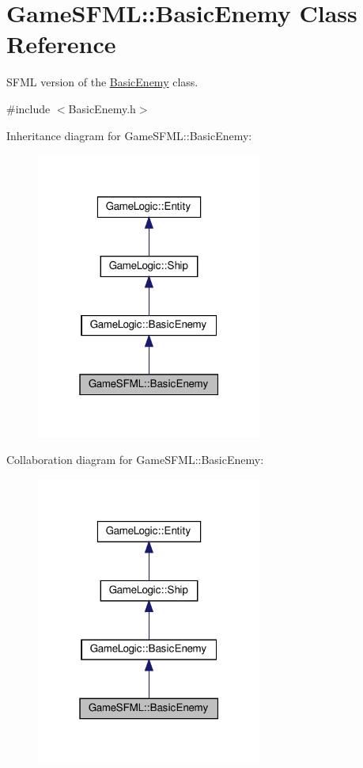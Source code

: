 \hypertarget{classGameSFML_1_1BasicEnemy}{}\section{Game\+S\+F\+ML\+:\+:Basic\+Enemy Class Reference}
\label{classGameSFML_1_1BasicEnemy}


S\+F\+ML version of the \hyperlink{classGameSFML_1_1BasicEnemy}{Basic\+Enemy} class.  




{\ttfamily \#include $<$Basic\+Enemy.\+h$>$}



Inheritance diagram for Game\+S\+F\+ML\+:\+:Basic\+Enemy\+:
\nopagebreak
\begin{figure}[H]
\begin{center}
\leavevmode
\includegraphics[width=211pt]{classGameSFML_1_1BasicEnemy__inherit__graph}
\end{center}
\end{figure}


Collaboration diagram for Game\+S\+F\+ML\+:\+:Basic\+Enemy\+:
\nopagebreak
\begin{figure}[H]
\begin{center}
\leavevmode
\includegraphics[width=211pt]{classGameSFML_1_1BasicEnemy__coll__graph}
\end{center}
\end{figure}
